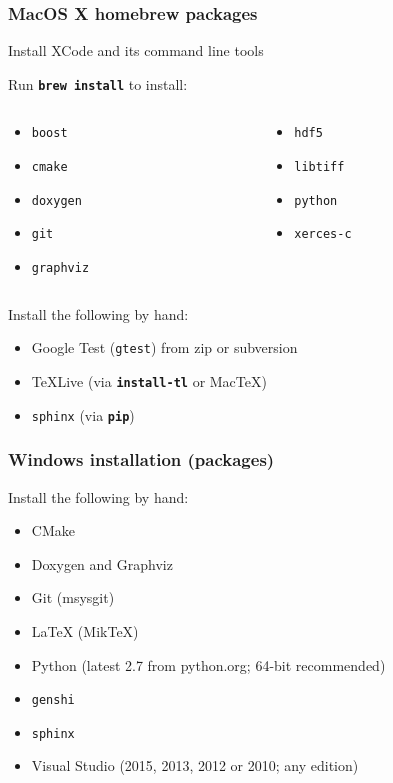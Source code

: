 \documentclass{beamer}
\newcommand{\cmd}[1]{\textbf{\texttt{#1}}}
\newcommand{\pkg}[1]{\texttt{#1}}
\begin{document}
\begin{frame}
  \frametitle{MacOS X homebrew packages}
  \scriptsize
  Install XCode and its command line tools
  \bigskip

  Run \cmd{brew install} to install:
  \begin{columns}
    \begin{column}{.5\linewidth}
      \begin{itemize}
      \item[] \pkg{boost}
      \item[] \pkg{cmake}
      \item[] \pkg{doxygen}
      \item[] \pkg{git}
      \item[] \pkg{graphviz}
      \end{itemize}
    \end{column}
    \begin{column}{.5\linewidth}
      \begin{itemize}
      \item[] \pkg{hdf5}
      \item[] \pkg{libtiff}
      \item[] \pkg{python}
      \item[] \pkg{xerces-c}
      \end{itemize}
    \end{column}
  \end{columns}
\bigskip
Install the following by hand:
\begin{itemize}
\item Google Test (\pkg{gtest}) from zip or subversion
\item \TeX{}Live (via \cmd{install-tl} or Mac\TeX{})
\item \pkg{sphinx} (via \cmd{pip})
\end{itemize}
\end{frame}

\begin{frame}
  \frametitle{Windows installation (packages)}
  Install the following by hand:
\begin{itemize}
\item CMake
\item Doxygen and Graphviz
\item Git (msysgit)
\item \LaTeX{} (Mik\TeX{})
\item Python (latest 2.7 from python.org; 64-bit recommended)
\item \pkg{genshi}
\item \pkg{sphinx}
\item Visual Studio (2015, 2013, 2012 or 2010; any edition)
\end{itemize}
\end{frame}
\end{document}
